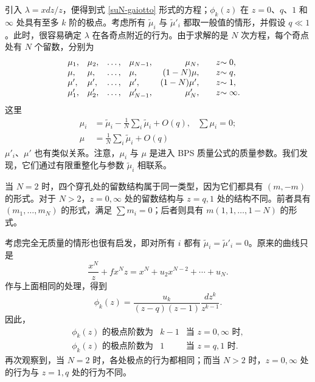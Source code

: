 引入 $\lambda=xdz/z$，便得到式 \eqref{suN-gaiotto} 形式的方程；$\phi_k(z)$ 在 $z=0$、$q$、$1$ 和 $\infty$ 处具有至多 $k$ 阶的极点。考虑所有 $\tilde\mu_i$ 与 $\tilde\mu'_i$ 都取一般值的情形，并假设 $q\ll1$。此时，很容易确定 $\lambda$ 在各奇点附近的行为。由于求解的是 $N$ 次方程，每个奇点处有 $N$ 个留数，分别为
\begin{equation}
\begin{array}{llllr@{\qquad}l@{}llll}
\mu_1,&\mu_2,&\ldots,&\mu_{N-1},&\mu_N,&z&\sim0,&\\
\mu,&\mu,&\ldots,&\mu,&(1-N)\mu,&z&\sim q,&\\
\mu',&\mu',&\ldots,&\mu',&(1-N)\mu',&z&\sim1,&\\
\mu'_1,&\mu'_2,&\ldots,&\mu'_{N-1},&\mu'_N,&z&\sim\infty.
\end{array}\label{simple-full-massive-condition}
\end{equation}
这里
\begin{align}
\mu_i&=\tilde\mu_i-\frac1N\sum_i\tilde\mu_i+O(q),&\sum\mu_i=0;\\
\mu&=\frac1N\sum_i\tilde\mu_i+O(q)
\end{align}
$\mu'_i$、$\mu'$ 也有类似关系。注意，$\mu_i$ 与 $\mu$ 是进入 BPS 质量公式的质量参数。我们发现，它们通过有限重整化与参数 $\tilde\mu_i$ 相联系。

当 $N=2$ 时，四个穿孔处的留数结构属于同一类型，因为它们都具有 $(m,-m)$ 的形式。对于 $N>2$，$z=0,\infty$ 处的留数结构与 $z=q,1$ 处的结构不同。前者具有 $(m_1,\ldots,m_N)$ 的形式，满足 $\sum m_i=0$；后者则具有 $m(1,1,\ldots,1-N)$ 的形式。

考虑完全无质量的情形也很有启发，即对所有 $i$ 都有 $\tilde\mu_i=\tilde\mu'_i=0$。原来的曲线只是
\begin{equation}
\frac{x^N}z+fx^Nz=x^N+u_2x^{N-2}+\cdots+u_N.
\end{equation}
作与上面相同的处理，得到
\begin{equation}
\phi_k(z)=\frac{u_k}{(z-q)(z-1)}\frac{dz^k}{z^{k-1}}.
\end{equation}
因此，
\begin{equation}
\begin{array}{rll}
\text{$\phi_k(z)$ 的极点阶数为}&k-1&\text{当 $z=0,\infty$ 时},\\
\text{$\phi_k(z)$ 的极点阶数为}&1&\text{当 $z=q,1$ 时}.
\end{array}\label{simple-full-condition}
\end{equation}
再次观察到，当 $N=2$ 时，各处极点的行为都相同；而当 $N>2$ 时，$z=0,\infty$ 处的行为与 $z=1,q$ 处的行为不同。

